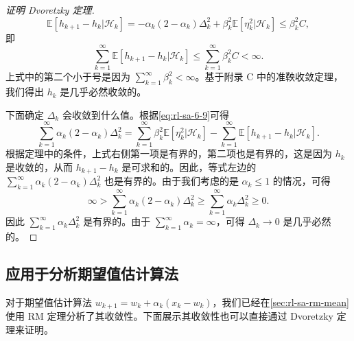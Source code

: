\begin{proof}[证明 Dvoretzky 定理]
\begin{equation}
\mathbb{E}[h_{k+1} - h_k | \mathcal{H}_k] = -\alpha_k (2 - \alpha_k) \Delta_k^2 + \beta_k^2 \mathbb{E}[\eta_k^2 | \mathcal{H}_k] \leqslant \beta_k^2 C,
\label{eq:rl-sa-6-9}
\end{equation}
即
\begin{equation}
\sum_{k=1}^{\infty} \mathbb{E}[h_{k+1} - h_k | \mathcal{H}_k] \leqslant \sum_{k=1}^{\infty} \beta_k^2 C < \infty.
\end{equation}
上式中的第二个小于号是因为 $\sum_{k=1}^{\infty} \beta_k^2 < \infty$。基于附录 C 中的准鞅收敛定理，我们得出 $h_k$ 是几乎必然收敛的。

下面确定 $\Delta_k$ 会收敛到什么值。根据\eqref{eq:rl-sa-6-9}可得
\begin{equation}
\sum_{k=1}^{\infty} \alpha_k (2 - \alpha_k) \Delta_k^2 = \sum_{k=1}^{\infty} \beta_k^2 \mathbb{E}[\eta_k^2 | \mathcal{H}_k] - \sum_{k=1}^{\infty} \mathbb{E}[h_{k+1} - h_k | \mathcal{H}_k].
\end{equation}
根据定理中的条件，上式右侧第一项是有界的，第二项也是有界的，这是因为 $h_k$ 是收敛的，从而 $h_{k+1} - h_k$ 是可求和的。因此，等式左边的 $\sum_{k=1}^{\infty} \alpha_k (2 - \alpha_k) \Delta_k^2$ 也是有界的。由于我们考虑的是 $\alpha_k \leqslant 1$ 的情况，可得
\begin{equation}
\infty > \sum_{k=1}^{\infty} \alpha_k (2 - \alpha_k) \Delta_k^2 \geqslant \sum_{k=1}^{\infty} \alpha_k \Delta_k^2 \geqslant 0.
\end{equation}
因此 $\sum_{k=1}^{\infty} \alpha_k \Delta_k^2$ 是有界的。由于 $\sum_{k=1}^{\infty} \alpha_k = \infty$，可得 $\Delta_k \to 0$ 是几乎必然的。
\end{proof}

\subsection{应用于分析期望值估计算法}
\label{sec:rl-sa-dvor-mean}

对于期望值估计算法 $w_{k+1} = w_k + \alpha_k (x_k - w_k)$，我们已经在\cref{sec:rl-sa-rm-mean}使用 RM 定理分析了其收敛性。下面展示其收敛性也可以直接通过 Dvoretzky 定理来证明。

